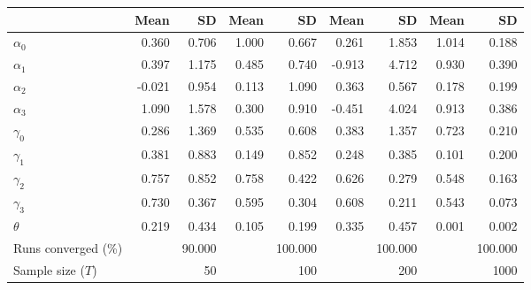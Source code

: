 
\begin{tabular}[t]{lrrrrrrrr}
\toprule
  & Mean & SD & Mean  & SD  & Mean   & SD   & Mean    & SD   \\
\midrule
$\alpha_{0}$ & 0.360 & 0.706 & 1.000 & 0.667 & 0.261 & 1.853 & 1.014 & 0.188\\
$\alpha_{1}$ & 0.397 & 1.175 & 0.485 & 0.740 & -0.913 & 4.712 & 0.930 & 0.390\\
$\alpha_{2}$ & -0.021 & 0.954 & 0.113 & 1.090 & 0.363 & 0.567 & 0.178 & 0.199\\
$\alpha_{3}$ & 1.090 & 1.578 & 0.300 & 0.910 & -0.451 & 4.024 & 0.913 & 0.386\\
$\gamma_{0}$ & 0.286 & 1.369 & 0.535 & 0.608 & 0.383 & 1.357 & 0.723 & 0.210\\
$\gamma_{1}$ & 0.381 & 0.883 & 0.149 & 0.852 & 0.248 & 0.385 & 0.101 & 0.200\\
$\gamma_{2}$ & 0.757 & 0.852 & 0.758 & 0.422 & 0.626 & 0.279 & 0.548 & 0.163\\
$\gamma_{3}$ & 0.730 & 0.367 & 0.595 & 0.304 & 0.608 & 0.211 & 0.543 & 0.073\\
$\theta$ & 0.219 & 0.434 & 0.105 & 0.199 & 0.335 & 0.457 & 0.001 & 0.002\\
Runs converged (\%) &  & 90.000 &  & 100.000 &  & 100.000 &  & 100.000\\
Sample size ($T$) &  & 50 &  & 100 &  & 200 &  & 1000\\
\bottomrule
\end{tabular}

